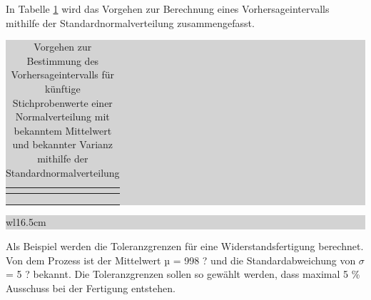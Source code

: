 \noindent In Tabelle \ref{tab:fivethirteen} wird das Vorgehen zur Berechnung eines Vorhersageintervalls mithilfe der Standardnormalverteilung zusammengefasst.

\begin{table}[H]
\setlength{\arrayrulewidth}{.1em}
\caption{Vorgehen zur Bestimmung des Vorhersageintervalls für künftige Stichprobenwerte einer Normalverteilung mit bekanntem Mittelwert und bekannter Varianz mithilfe der Standardnormalverteilung}
\setlength{\fboxsep}{0pt}%
\colorbox{lightgray}{%
%
\begin{tabular}{| c | c |}
\hline
\parbox[c][0.3in][c]{0.4in}{\smallskip\centering\textbf{\selectfont{Nr.}}} & 
\parbox[c][0.3in][c]{6.2in}{\smallskip\centering\textbf{\selectfont{Prozessschritt}}}\\ \hline

\parbox[c][0.3in][c]{0.4in}{\centering{}\selectfont{1}} & 
\parbox[c][0.3in][c]{6.2in}{\centering{}\selectfont{Wahl einer Konfidenzzahl $\gamma$}}\\ \hline

\parbox[c][0.9in][c]{0.4in}{\centering{}\selectfont{2}} & 
\parbox[c][0.9in][c]{6.2in}{\centering{}}\\ \hline

\parbox[c][0.9in][c]{0.4in}{\centering{}\selectfont{3}} & 
\parbox[c][0.9in][c]{6.2in}{\centering{}}\\ \hline

\end{tabular}%
}
\label{tab:fivethirteen}
\end{table}

\noindent
\colorbox{lightgray}{%
%
\renewcommand\arraystretch{0.6}%
\begin{tabular}{ wl{16.5cm} }
{\selectfont
{}}
\end{tabular}%
}\medskip

\noindent Als Beispiel werden die Toleranzgrenzen f\"{u}r eine Widerstandsfertigung berechnet. Von dem Prozess ist der Mittelwert µ = 998 ? und die Standardabweichung von $\sigma$ = 5 ? bekannt. Die Toleranzgrenzen sollen so gew\"{a}hlt werden, dass maximal 5 \% Ausschuss bei der Fertigung entstehen. \newline

